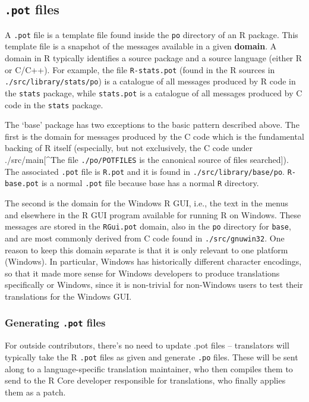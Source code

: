 \documentclass[
]{book}
\begin{document}
\hypertarget{pot-files}{%
\subsection{\texorpdfstring{\texttt{.pot} files}{.pot files}}\label{pot-files}}

A \texttt{.pot} file is a template file found inside the \texttt{po} directory of an R package.
This template file is a snapshot of the messages available in a given \textbf{domain}. A domain in R typically identifies
a source package and a source language (either R or C/C++). For example, the file \texttt{R-stats.pot}
(found in the R sources in \texttt{./src/library/stats/po}) is a catalogue of all messages produced by R code in the
\texttt{stats} package, while \texttt{stats.pot} is a catalogue of all messages produced by C code in the \texttt{stats} package.

The `base' package has two exceptions to the basic pattern described above. The first is the domain for messages produced by
the C code which is the fundamental backing of R itself (especially, but not exclusively, the C code under
./src/main{[}\^{}The file \texttt{./po/POTFILES} is the canonical source of files searched{]}). The associated \texttt{.pot} file is \texttt{R.pot} and
it is found in \texttt{./src/library/base/po}. \texttt{R-base.pot} is a normal \texttt{.pot} file because base has a normal \texttt{R} directory.

The second is the domain for the Windows R GUI, i.e., the text in the menus and elsewhere in the R GUI program
available for running R on Windows. These messages are stored in the \texttt{RGui.pot} domain, also in the \texttt{po}
directory for \texttt{base}, and are most commonly derived from C code found in \texttt{./src/gnuwin32}. One reason to keep
this domain separate is that it is only relevant to one platform (Windows). In particular, Windows has historically
different character encodings, so that it made more sense for Windows developers to produce translations specifically
or Windows, since it is non-trivial for non-Windows users to test their translations for the Windows GUI.

\hypertarget{generating-.pot-files}{%
\subsubsection{\texorpdfstring{Generating \texttt{.pot} files}{Generating .pot files}}\label{generating-.pot-files}}

For outside contributors, there's no need to update .pot files -- translators will typically take the R \texttt{.pot} files
as given and generate \texttt{.po} files. These will be sent along to a language-specific translation maintainer, who then
compiles them to send to the R Core developer responsible for translations, who finally applies them as a patch.
\end{document}
